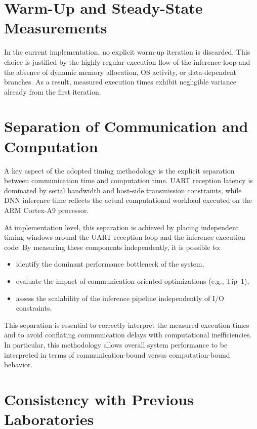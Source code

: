 \section{Warm-Up and Steady-State Measurements}

In the current implementation, no explicit warm-up iteration is discarded.
This choice is justified by the highly regular execution flow of the inference
loop and the absence of dynamic memory allocation, OS activity, or data-dependent
branches.
As a result, measured execution times exhibit negligible variance already from
the first iteration.



\section{Separation of Communication and Computation}

A key aspect of the adopted timing methodology is the explicit separation between
communication time and computation time.
UART reception latency is dominated by serial bandwidth and host-side transmission
constraints, while DNN inference time reflects the actual computational workload
executed on the ARM Cortex-A9 processor.

At implementation level, this separation is achieved by placing independent
timing windows around the UART reception loop and the inference execution code.
By measuring these components independently, it is possible to:
\begin{itemize}
    \item identify the dominant performance bottleneck of the system,
    \item evaluate the impact of communication-oriented optimizations (e.g., Tip~1),
    \item assess the scalability of the inference pipeline independently of I/O
          constraints.
\end{itemize}

This separation is essential to correctly interpret the measured execution times
and to avoid conflating communication delays with computational inefficiencies.
In particular, this methodology allows overall system performance to be
interpreted in terms of communication-bound versus computation-bound behavior.


\section{Consistency with Previous Laboratories}

